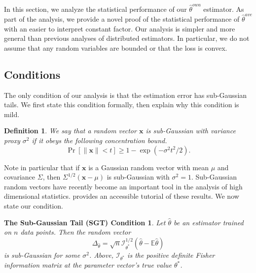 \documentclass[twoside]{article}
\newtheorem{defn}{Definition}
\newcommand{\E}{\mathbb{E}}
\newcommand{\x}{\mathbf{x}}
\newcommand{\w}{\theta}
\newcommand{\wowa}{\hat\w^{owa}}
\newcommand{\wave}{\hat\w^{ave}}
\newcommand{\wmle}{\hat\w^{erm}}
\newcommand{\wstar}{{\w^{*}}}
\newcommand{\what}{{\hat\w}}
\newcommand{\I}{\mathcal I}
\newcommand{\ltwo}[1]{{\lVert {#1} \rVert}}
\newcommand{\ltwobig}[1]{{\left\lVert {#1} \right\rVert}}
\newcommand{\prob}[1]{\Pr\left[{#1}\right]}
\begin{document}
In this section, we analyze the statistical performance of our $\wowa$ estimator.
As part of the analysis, we provide a novel proof of the statistical performance of $\wave$ with an easier to interpret constant factor.
Our analysis is simpler and more general than previous analyses of distributed estimators.
In particular, we do not assume that any random variables are bounded
or that the loss is convex.

\subsection{Conditions}

The only condition of our analysis is that the estimation error has sub-Gaussian tails.
We first state this condition formally,
then explain why this condition is mild.

\begin{defn}
We say that a random vector $\x$ is \emph{sub-Gaussian} with variance proxy $\sigma^2$ if it obeys the following concentration bound.
\begin{equation}
\prob{\ltwo{\x} < t} \ge 1 - \exp(-\sigma^2t^2/2)
.
\end{equation}
\end{defn}

Note in particular that if $\x$ is a Gaussian random vector with mean $\mu$ and covariance $\Sigma$,
then $\Sigma^{1/2}(\x-\mu)$ is sub-Gaussian with $\sigma^2=1$.
Sub-Gaussian random vectors have recently become an important tool in the analysis of high dimensional statistics.
\citet{vershynin2010introduction} provides an accessible tutorial of these results.
We now state our condition.

\newtheorem*{sgt}{The Sub-Gaussian Tail (SGT) Condition}
\begin{sgt}
Let $\what$ be an estimator trained on $n$ data points.
Then the random vector
\begin{equation}
\Delta_\what = \sqrt{n}{\I^{1/2}_\wstar(\what-\E\what)}
\end{equation}
is sub-Gaussian for some $\sigma^2$.
Above, $\I_\wstar$ is the positive definite Fisher information matrix at the parameter vector's true value $\wstar$.
\end{sgt}
\end{document}
